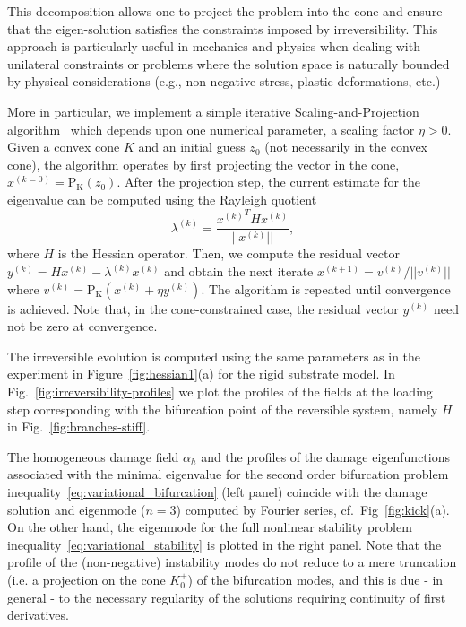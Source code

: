 \documentclass[10pt]{article}
\begin{document}
This decomposition allows one to project the problem into the cone and ensure that the eigen-solution satisfies the constraints imposed by irreversibility. This approach is particularly useful in mechanics and physics when dealing with unilateral constraints or problems where the solution space is naturally bounded by physical considerations (e.g., non-negative stress, plastic deformations, etc.) 

More in particular, we implement a simple iterative Scaling-and-Projection algorithm~\cite{Pinto_da_Costa2010-qv} which depends upon one numerical parameter, a scaling factor $\eta>0$. Given a convex cone  $K$ and an initial guess $z_0$ (not necessarily in the convex cone), the algorithm operates by first projecting the vector in the cone, $x^{(k=0)}= \operatorname{P_K}(z_0)$.  
After the projection step, the current estimate for the eigenvalue can be computed using the Rayleigh quotient
\begin{equation}
    \lambda^{(k)} = \frac{{x^{(k)}}^T H x^{(k)}}{||x^{(k)}||},
\end{equation}
where $H$ is the Hessian operator. Then, we compute the residual vector $y^{(k)} = H x^{(k)} - \lambda^{(k)} x^{(k)}$ and obtain the next iterate $x^{(k+1)} = v^{(k)}/||v^{(k)}||$ where 
$v^{(k)} =\operatorname{P_K} (x^{(k)} + \eta y^{(k)})$.
The algorithm is repeated until convergence is achieved. Note that, in the cone-constrained case, the residual vector $y^{(k)}$ need not be zero at convergence.

The irreversible evolution is computed using the same parameters as in the experiment in Figure~\ref{fig:hessian1}(a) for the rigid substrate model. In Fig.~\ref{fig:irreversibility-profiles} we plot the profiles of the fields at the loading step corresponding with the bifurcation point of the reversible system, namely $H$ in Fig.~\ref{fig:branches-stiff}.


The homogeneous damage field $\alpha_h$ and the profiles of the damage eigenfunctions associated with  the minimal eigenvalue for the second order bifurcation problem inequality~\eqref{eq:variational_bifurcation} (left panel) coincide with the damage solution and eigenmode ($n=3$) computed by Fourier series, {cf.~Fig~\ref{fig:kick}(a).}
On the other hand, the eigenmode for the full nonlinear stability problem inequality~\eqref{eq:variational_stability} is plotted in the right panel.
Note that the profile of the (non-negative) instability modes do not reduce to a mere truncation (i.e. a projection on the cone $K^+_0$) of the bifurcation modes, and this is due - in general - to the necessary regularity of the solutions requiring continuity of first derivatives. 
\end{document}
